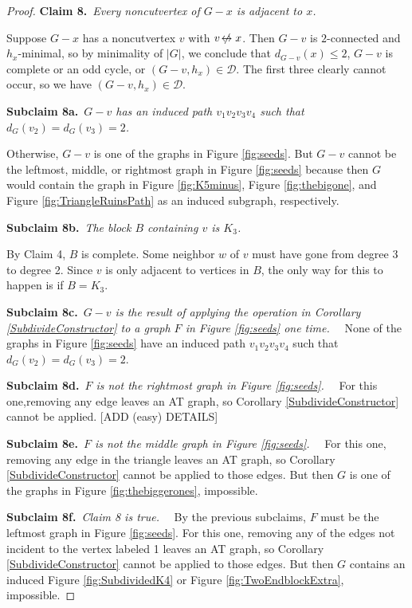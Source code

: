 \documentclass[12pt]{article}
\theoremstyle{plain}
\theoremstyle{definition}
\theoremstyle{remark}
\newcommand{\fancy}[1]{\mathcal{#1}}
\newcommand{\D}{\fancy{D}}
\newcommand{\card}[1]{\left|#1\right|}
\def\nonadj{\not\!\leftrightarrow}
\def\D{\fancy{D}}
\newcommand{\claim}[2]{{\bf Claim #1.}~{\it #2}~~}
\newcommand{\subclaim}[2]{{\bf Subclaim #1.}~{\it #2}~~}
\begin{document}
\begin{proof}
	 \claim{8}{Every noncutvertex of $G-x$ is adjacent to $x$.}
	 
	 Suppose $G-x$ has a noncutvertex $v$ with $v \nonadj x$. Then $G-v$ is $2$-connected and $h_x$-minimal, so by minimality of $\card{G}$, we conclude that $d_{G-v}(x) \le 2$, $G-v$ is complete or an odd cycle, or $(G-v,h_x) \in \D$.  The first three clearly cannot occur, so we have $(G-v,h_x) \in \D$.  
	 
	 \subclaim{8a}{$G-v$ has an induced path $v_1v_2v_3v_4$ such that $d_G(v_2) = d_G(v_3) = 2$.}
	 
	 Otherwise, $G-v$ is one of the graphs in Figure \ref{fig:seeds}.  But $G-v$ cannot be the leftmost, middle, or rightmost graph in Figure \ref{fig:seeds} because then $G$ would contain the graph in Figure \ref{fig:K5minus}, Figure \ref{fig:thebigone}, and Figure \ref{fig:TriangleRuinsPath} as an induced subgraph, respectively.  
	 	 
	 \subclaim{8b}{The block $B$ containing $v$ is $K_3$.}
	 
	 By Claim 4, $B$ is complete. Some neighbor $w$ of $v$ must have gone from degree 3 to degree 2. Since $v$ is only adjacent to vertices in $B$,	 
	 the only way for this to happen is if $B = K_3$.  
	 
	 \subclaim{8c}{$G-v$ is the result of applying the operation in Corollary \ref{SubdivideConstructor} to a graph $F$ in Figure \ref{fig:seeds} one time.}
	 None of the graphs in Figure \ref{fig:seeds} have an induced path $v_1v_2v_3v_4$ such that $d_G(v_2) = d_G(v_3) = 2$.

	 \subclaim{8d}{$F$ is not the rightmost graph in Figure \ref{fig:seeds}.}
	 For this one,removing any edge leaves an AT graph, so Corollary \ref{SubdivideConstructor} cannot be applied. [ADD (easy) DETAILS]
	
	 \subclaim{8e}{$F$ is not the middle graph in Figure \ref{fig:seeds}.}
 	  For this one, removing any edge in the triangle leaves an AT graph, so Corollary \ref{SubdivideConstructor} cannot be applied to those edges.  But then $G$ is one of the graphs in Figure \ref{fig:thebiggerones}, impossible.
	 
	 \subclaim{8f}{Claim 8 is true.}
	 By the previous subclaims, $F$ must be the leftmost graph in Figure \ref{fig:seeds}. For this one, removing any of the edges not incident to the vertex labeled 1 leaves an AT graph, so Corollary \ref{SubdivideConstructor} cannot be applied to those edges.  But then $G$ contains an induced Figure \ref{fig:SubdividedK4} or Figure \ref{fig:TwoEndblockExtra}, impossible.
	 

\end{proof}
\end{document}
